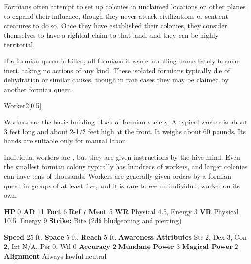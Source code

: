       Formians often attempt to set up colonies in unclaimed locations on other planes to expand their influence, though they never attack civilizations or sentient creatures to do so.
      Once they have established their colonies, they consider themselves to have a rightful claim to that land, and they can be highly territorial.

      If a formian queen is killed, all formians it was controlling immediately become inert, taking no actions of any kind.
      These isolated formians typically die of dehydration or similar causes, though in rare cases they may be claimed by another formian queen.
    

      
  \begin{monsubsection}{Worker}{2}[0.5]
    \vspace{-1em}\vspace{-1em}
    \vspace{0em}

    
          Workers are the basic building block of formian society.
          A typical worker is about 3 feet long and about 2-1/2 feet high at the front.
          It weighs about 60 pounds.
          Its hands are suitable only for manual labor.
        
          Individual workers are , but they are given instructions by the hive mind.
          Even the smallest formian colony typically has hundreds of workers, and larger colonies can have tens of thousands.
          Workers are generally given orders by a formian queen in groups of at least five, and it is rare to see an individual worker on its own.
        

    \begin{spellcontent}
      \begin{spelltargetinginfo}
        \pari \textbf{HP} 0 \monsep
          \textbf{AD} 11 \monsep
          \textbf{Fort} 6 \monsep
          \textbf{Ref} 7 \monsep
          \textbf{Ment} 5
        \pari \textbf{WR} Physical 4.5, Energy 3 \monsep
        \textbf{VR} Physical 10.5, Energy 9
        \pari \textbf{Strike:}
            Bite  (2d6 bludgeoning and piercing)
      \end{spelltargetinginfo}
    \end{spellcontent}
    \begin{monsterfooter}
      \pari \textbf{Speed} 25 ft. \monsep
        \textbf{Space} 5 ft. \monsep
        \textbf{Reach} 5 ft.
      \pari \textbf{Awareness} 
      \pari \textbf{Attributes}
        Str 2, Dex 3,
        Con 2, Int N/A,
        Per 0, Wil 0
      \pari \textbf{Accuracy} 2 \monsep
        \textbf{Mundane Power} 3 \monsep
      \textbf{Magical Power} 2
      \pari \textbf{Alignment} Always lawful neutral
    \end{monsterfooter}
  \end{monsubsection}
